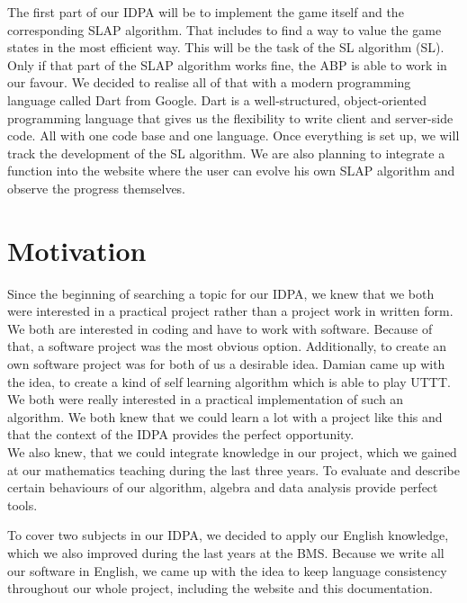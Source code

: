 The first part of our IDPA will be to implement the game itself and the corresponding SLAP algorithm. 
That includes to find a way to value the \acp{game state} in the most efficient way. This will be the task of the \acl{SL} algorithm (\ac{SL}). Only if that part of the \ac{SLAP} algorithm works fine, the \ac{ABP} is able to work in our favour.
We decided to realise all of that with a modern programming language called Dart from Google. Dart is a well-structured, object-oriented programming language that gives us the flexibility to write client and server-side code. All with one code base and one language. Once everything is set up, we will track the development of the \ac{SL} algorithm. We are also planning to integrate a function into the website where the user can evolve his own \ac{SLAP} algorithm and observe the progress themselves.

\section{Motivation}
Since the beginning of searching a topic for our IDPA, we knew that we both were interested in a practical project rather than a  project work in written form. We both are interested in coding and have to work with software. Because of that, a software project was the most obvious option. Additionally, to create an own software project was for both of us a desirable idea.
Damian came up with the idea, to create a kind of self learning algorithm which is able to play \ac{UTTT}. We both were really interested in a practical implementation of such an algorithm. We both knew that we could learn a lot with a project like this and that the context of the IDPA provides the perfect opportunity. \\

We also knew, that we could integrate knowledge in our project, which we gained at our mathematics teaching during the last three years. To evaluate and describe certain behaviours of our algorithm, algebra and data analysis provide perfect tools.

To cover two subjects in our IDPA, we decided to apply our English knowledge, which we also improved during the last years at the BMS. Because we write all our software in English, we came up with the idea to keep language consistency throughout our whole project, including the website and this documentation. 

